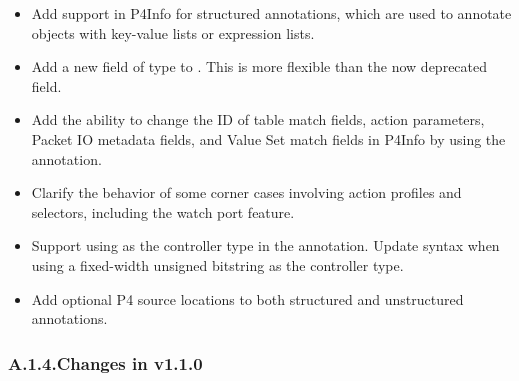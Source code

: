 \documentclass[11pt]{article}
\begin{document}
{\begin{itemize}[noitemsep,topsep=\mdcompacttopsep]
\item{}Add support in P4Info for structured annotations, which are used to annotate
objects with key-value lists or expression lists.%

\item{}Add a new  field of type  to . This is more
flexible than the now deprecated  field.%

\item{}Add the ability to change the ID of table match fields, action parameters,
Packet IO metadata fields, and Value Set match fields in P4Info by using the
 annotation.%

\item{}Clarify the behavior of some corner cases involving action profiles and
selectors, including the watch port feature.%

\item{}Support using  as the controller type in the 
annotation. Update syntax when using a fixed-width unsigned bitstring as the
controller type.%

\item{}Add optional P4 source locations to both structured and unstructured
annotations.%
\end{itemize}%

\subsubsection{A.1.4.\hspace*{0.5em}Changes in v1.1.0}\label{sec-changes-in-v110}%

}
\end{document}
